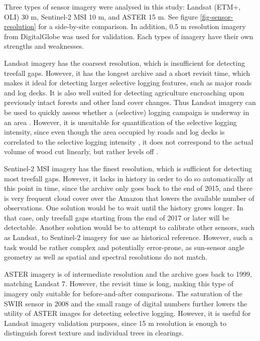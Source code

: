 \documentclass[a4paper,12pt]{scrbook}
\begin{document}
Three types of sensor imagery were analysed in this study: Landsat (\ac{ETM+}, \ac{OLI}) 30 m, Sentinel-2 \ac{MSI} 10 m, and \ac{ASTER} 15 m. See figure \ref{fig-sensor-resolution} for a side-by-site comparison. In addition, 0.5 m resolution imagery from DigitalGlobe was used for validation. Each types of imagery have their own strengths and weaknesses.

Landsat imagery has the coarsest resolution, which is insufficient for detecting treefall gaps. However, it has the longest archive and a short revisit time, which makes it ideal for detecting larger selective logging features, such as major roads and log decks. It is also well suited for detecting agriculture encroaching upon previously intact forests and other land cover changes. Thus Landsat imagery can be used to quickly assess whether a (selective) logging campaign is underway in an area \citep{frolking_forest_2009}. However, it is unsuitable for quantification of the selective logging intensity, since even though the area occupied by roads and log decks is correlated to the selective logging intensity \citep{jackson_area_2002}, it does not correspond to the actual volume of wood cut linearly, but rather levels off \citep{broadbent_recovery_2006}.

Sentinel-2 \ac{MSI} imagery has the finest resolution, which is sufficient for detecting most treefall gaps. However, it lacks in history in order to do so automatically at this point in time, since the archive only goes back to the end of 2015, and there is very frequent cloud cover over the Amazon that lowers the available number of observations. One solution would be to wait until the history grows longer. In that case, only treefall gaps starting from the end of 2017 or later will be detectable. Another solution would be to attempt to calibrate other sensors, such as Landsat, to Sentinel-2 imagery for use as historical reference. However, such a task would be rather complex and potentially error-prone, as sun-sensor angle geometry as well as spatial and spectral resolutions do not match.

\ac{ASTER} imagery is of intermediate resolution and the archive goes back to 1999, matching Landsat 7. However, the revisit time is long, making this type of imagery only suitable for before-and-after comparisons. The saturation of the \ac{SWIR} sensor in 2008 and the small range of digital numbers further lowers the utility of \ac{ASTER} images for detecting selective logging. However, it is useful for Landsat imagery validation purposes, since 15 m resolution is enough to distinguish forest texture and individual trees in clearings.
\end{document}
